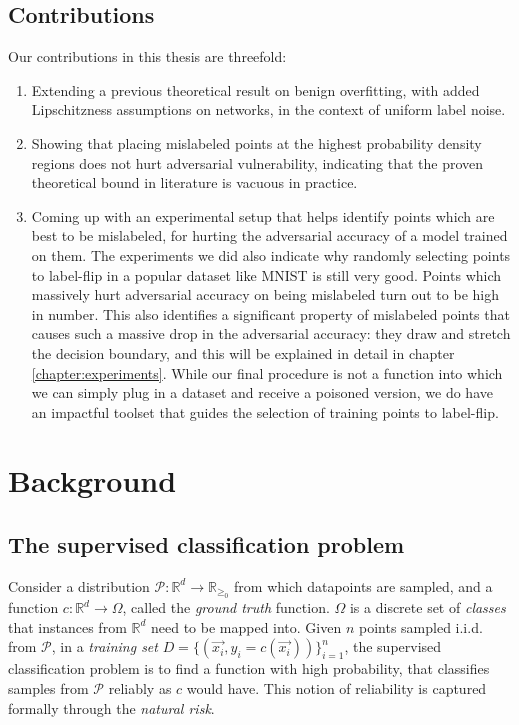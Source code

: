 \documentclass{ociamthesis}
\begin{document}
\section{Contributions}
Our contributions in this thesis are threefold:
\begin{enumerate}
    \item Extending a previous theoretical result on benign overfitting, with
    added Lipschitzness assumptions on networks, in the context of uniform label
    noise.
    \item Showing that placing mislabeled points at the highest probability
    density regions does not hurt adversarial vulnerability, indicating that the
    proven theoretical bound in literature is vacuous in practice.
    \item Coming up with an experimental setup that helps identify points which
    are best to be mislabeled, for hurting the adversarial accuracy of a model
    trained on them. The experiments we did also indicate why randomly selecting
    points to label-flip in a popular dataset like MNIST is still very good.
    Points which massively hurt adversarial accuracy on being mislabeled turn
    out to be high in number. This also identifies a significant property of
    mislabeled points that causes such a massive drop in the adversarial
    accuracy: they draw and stretch the decision boundary, and this will be
    explained in detail in chapter \ref{chapter:experiments}. While our final
    procedure is not a function into which we can simply plug in a dataset and
    receive a poisoned version, we do have an impactful toolset that guides the
    selection of training points to label-flip.
\end{enumerate}


\chapter{Background}
\section{The supervised classification problem}

Consider a distribution $\mathcal{P}: \mathbb{R}^d \to \mathbb{R}_{\geq_0}$ from
which datapoints are sampled, and a function $c: \mathbb{R}^d \to \Omega$,
called the \emph{ground truth} function. $\Omega$ is a discrete set of
\emph{classes} that instances from $\mathbb{R}^d$ need to be mapped into. Given
$n$ points sampled i.i.d. from $\mathcal{P}$, in a \emph{training set}
$D=\{(\vec{x_i}, y_i=c(\vec{x_i}))\}_{i=1}^{n}$, the supervised classification
problem is to find a function with high probability, that classifies samples
from $\mathcal{P}$ reliably as $c$ would have. This notion of reliability is
captured formally through the \emph{natural risk}.
\end{document}
